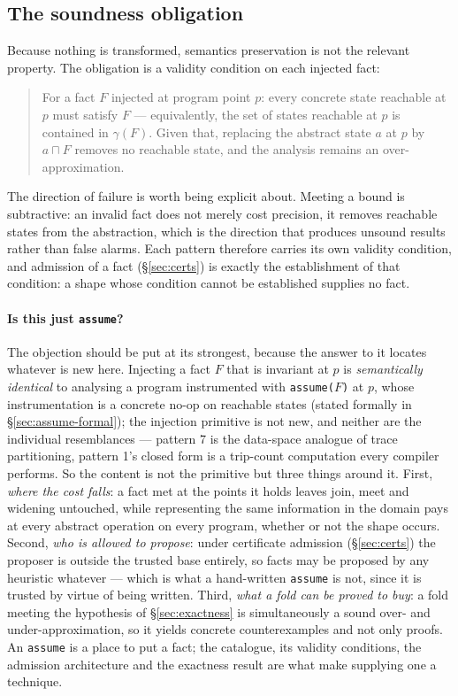 \documentclass[11pt,a4paper]{article}
\begin{document}
\subsection{The soundness obligation}
\label{sec:validity}

Because nothing is transformed, semantics preservation is not the relevant property. The
obligation is a validity condition on each injected fact:

\begin{quote}
For a fact $F$ injected at program point $p$: every concrete state reachable at $p$ must
satisfy $F$ --- equivalently, the set of states reachable at $p$ is contained in
$\gamma(F)$. Given that, replacing the abstract state $a$ at $p$ by $a \sqcap F$ removes
no reachable state, and the analysis remains an over-approximation.
\end{quote}

The direction of failure is worth being explicit about. Meeting a bound is subtractive: an
invalid fact does not merely cost precision, it removes reachable states from the
abstraction, which is the direction that produces unsound results rather than false
alarms. Each pattern therefore carries its own validity condition, and admission of a fact
(\S\ref{sec:certs}) is exactly the establishment of that condition: a shape whose
condition cannot be established supplies no fact.

\paragraph{Is this just \texttt{assume}?} The objection should be put at its strongest,
because the answer to it locates whatever is new here. Injecting a fact $F$ that is
invariant at $p$ is \emph{semantically identical} to analysing a program instrumented with
\texttt{assume($F$)} at $p$, whose instrumentation is a concrete no-op on reachable states
(stated formally in \S\ref{sec:assume-formal}); the injection primitive is not new, and neither are the individual
resemblances --- pattern 7 is the data-space analogue of trace partitioning, pattern 1's
closed form is a trip-count computation every compiler performs. So the content is not the
primitive but three things around it. First, \emph{where the cost falls}: a fact met at the
points it holds leaves join, meet and widening untouched, while representing the same
information in the domain pays at every abstract operation on every program, whether or not
the shape occurs. Second, \emph{who is allowed to propose}: under certificate admission
(\S\ref{sec:certs}) the proposer is outside the trusted base entirely, so facts may be
proposed by any heuristic whatever --- which is what a hand-written \texttt{assume} is
not, since it is trusted by virtue of being written. Third, \emph{what a fold can be
proved to buy}: a fold meeting the hypothesis of \S\ref{sec:exactness} is simultaneously a
sound over- and under-approximation, so it yields concrete counterexamples and not only
proofs. An \texttt{assume} is a place to put a fact; the catalogue, its validity
conditions, the admission architecture and the exactness result are what make supplying one
a technique.
\end{document}
